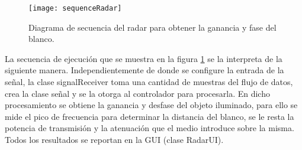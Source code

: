 \begin{figure}[htb]
 \centering
 \texttt{[image: sequenceRadar]}
 \caption{Diagrama de secuencia del radar para obtener la ganancia y fase del blanco.}
 \label{fig:radarsSequence}
\end{figure}
La secuencia de ejecución que se muestra en la figura \ref{fig:radarsSequence} se la interpreta de la siguiente manera. Independientemente de donde se configure la entrada de la señal, la clase signalReceiver toma una cantidad de muestras del flujo de datos, crea la clase señal y se la otorga al controlador para procesarla. En dicho procesamiento se obtiene la ganancia y desfase del objeto iluminado, para ello se mide el pico de frecuencia para determinar la distancia del blanco, se le resta la potencia de transmisión y la atenuación que el medio introduce sobre la misma. Todos los resultados se reportan en la GUI (clase RadarUI).

